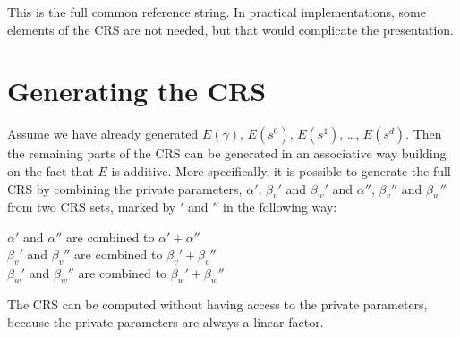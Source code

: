 \documentclass[11pt,letterpaper]{article}
\begin{document}
This is the full common reference string. In practical implementations, some elements of the CRS are not needed, but that would complicate the presentation.

\section{Generating the CRS}

Assume we have already generated $E(\gamma)$, $E(s^{0})$, $E(s^{1})$,  \dots, $E(s^{d})$.
Then the remaining parts of the CRS can be generated in an associative way building on the
fact that $E$ is additive. More specifically, it is possible to generate the full CRS
by combining the private parameters, $\alpha'$, $\beta_v'$ and $\beta_w'$ 
and $\alpha''$, $\beta_v''$ and $\beta_w''$ from two CRS sets, marked by $'$ and $''$
in the following way:

$\alpha'$ and $\alpha''$ are combined to $\alpha' + \alpha''$\\
$\beta_v'$ and $\beta_v''$ are combined to $\beta_v' + \beta_v''$\\
$\beta_w'$ and $\beta_w''$ are combined to $\beta_w' + \beta_w''$

The CRS can be computed without having access to the private parameters, because
the private parameters are always a linear factor.
\end{document}

